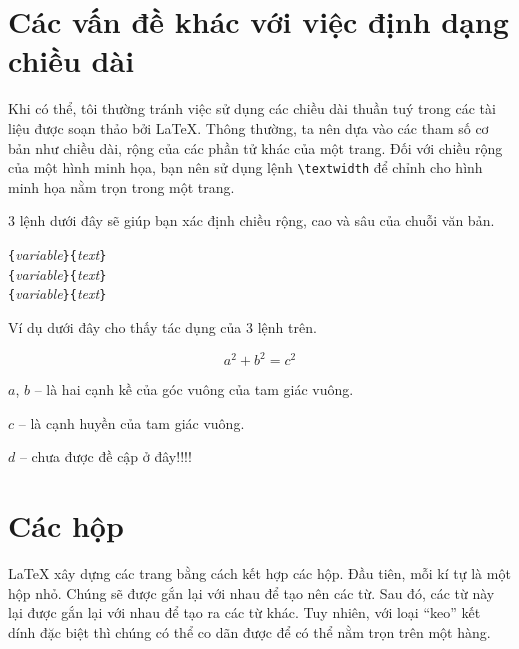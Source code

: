 \section{Các vấn đề khác với việc định dạng chiều dài}
Khi có thể, tôi thường tránh việc sử dụng các chiều dài thuần tuý
trong các tài liệu được soạn thảo bởi \LaTeX{}. Thông thường, ta
nên dựa vào các tham số cơ bản như chiều dài, rộng của các phần tử
khác của một trang. Đối với chiều rộng của một hình minh họa, bạn
nên sử dụng lệnh \verb|\textwidth| để chỉnh cho hình minh họa nằm
trọn trong một trang.

3 lệnh dưới đây sẽ giúp bạn xác định chiều rộng, cao và sâu của
chuỗi văn bản.

\begin{lscommand}
\verb|{|\emph{variable}\verb|}{|\emph{text}\verb|}|\\
\verb|{|\emph{variable}\verb|}{|\emph{text}\verb|}|\\
\verb|{|\emph{variable}\verb|}{|\emph{text}\verb|}|
\end{lscommand}

\noindent Ví dụ dưới đây cho thấy tác dụng của 3 lệnh trên.

\begin{example}
\flushleft
\newenvironment{vardesc}[1]{%
  \settowidth{\parindent}{#1:\ }
  \makebox[0pt][r]{#1:\ }}{}

\begin{displaymath}
a^2+b^2=c^2
\end{displaymath}

\begin{vardesc}{Với}$a$,
$b$ -- là hai cạnh kề của
góc vuông của tam giác vuông.

$c$ -- là cạnh huyền của
tam giác vuông.

$d$ -- chưa được đề cập ở đây!!!!
\end{vardesc}
\end{example}

\section{Các hộp}
\LaTeX{} xây dựng các trang bằng cách kết hợp các hộp. Đầu tiên,
mỗi kí tự là một hộp nhỏ. Chúng sẽ được gắn lại với nhau để tạo
nên các từ. Sau đó, các từ này lại được gắn lại với nhau để tạo ra
các từ khác. Tuy nhiên, với loại ``keo'' kết dính đặc biệt thì
chúng có thể co dãn được để có thể nằm trọn trên một hàng.

